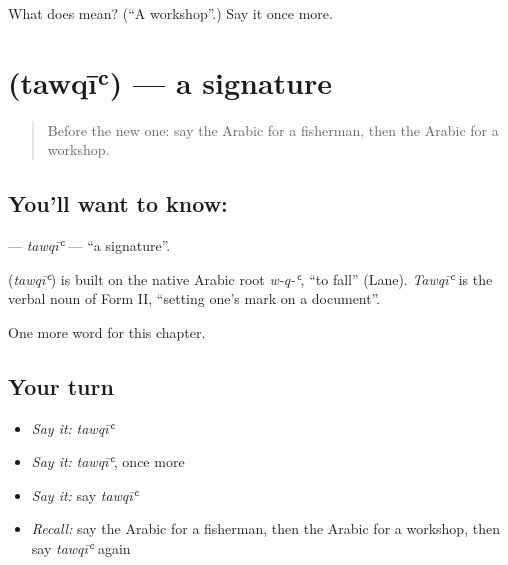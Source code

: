 \begin{tcolorbox}[breakable,colback=teal!4,colframe=teal!35!black,title={Before you move on}]
What does  mean? (\textquotedblleft{}A workshop\textquotedblright{}.) Say it once more.
\end{tcolorbox}
\section[\texorpdfstring{\ar{توقيع} (tawqīʿ)}{توقيع (tawqīʿ)}]{ (tawqīʿ) — a signature}

\label{lesson:AR-C191-tawqi}



\begin{quote}
Before the new one: say the Arabic for a fisherman, then the Arabic for a workshop.
\end{quote}

\subsection*{You'll want to know: }
\textbf{} — \emph{tawqīʿ} — \textquotedblleft{}a signature\textquotedblright{}.

\begin{cousinweb}
\textbf{} (\emph{tawqīʿ}) is built on the native Arabic root \emph{w-q-ʿ}, \textquotedblleft{}to fall\textquotedblright{} (Lane). \emph{Tawqīʿ} is the verbal noun of Form II, \textquotedblleft{}setting one's mark on a document\textquotedblright{}.
\end{cousinweb}

\begin{grammarlens}[title={What you've built}]
One more word for this chapter.
\end{grammarlens}

\subsection*{Your turn}
\begin{itemize}
\raggedright
  \item \emph{Say it:} \emph{tawqīʿ}
  \item \emph{Say it:} \emph{tawqīʿ}, once more
  \item \emph{Say it:} say \emph{tawqīʿ}
  \item \emph{Recall:} say the Arabic for a fisherman, then the Arabic for a workshop, then say \emph{tawqīʿ} again
\end{itemize}

